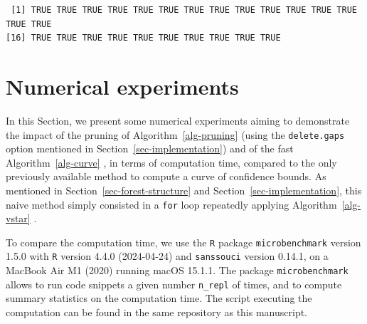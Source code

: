 \documentclass[
  11pt,
  a4paper,
]{article}
\newenvironment{Shaded}{}{}
\newcommand{\AttributeTok}[1]{\textcolor[rgb]{0.84,0.23,0.29}{#1}}
\newcommand{\CommentTok}[1]{\textcolor[rgb]{0.42,0.45,0.49}{#1}}
\newcommand{\ConstantTok}[1]{\textcolor[rgb]{0.00,0.36,0.77}{#1}}
\newcommand{\FunctionTok}[1]{\textcolor[rgb]{0.44,0.26,0.76}{#1}}
\newcommand{\NormalTok}[1]{\textcolor[rgb]{0.14,0.16,0.18}{#1}}
\newcommand{\OtherTok}[1]{\textcolor[rgb]{0.44,0.26,0.76}{#1}}
\newcommand{\SpecialCharTok}[1]{\textcolor[rgb]{0.00,0.36,0.77}{#1}}
\theoremstyle{definition}
\theoremstyle{plain}
\theoremstyle{plain}
\theoremstyle{plain}
\theoremstyle{definition}
\theoremstyle{remark}
\begin{document}
\begin{Shaded}
\end{Shaded}

\begin{verbatim}
 [1] TRUE TRUE TRUE TRUE TRUE TRUE TRUE TRUE TRUE TRUE TRUE TRUE TRUE TRUE TRUE
[16] TRUE TRUE TRUE TRUE TRUE TRUE TRUE TRUE TRUE TRUE
\end{verbatim}

\section{Numerical experiments}\label{sec-numeric}

In this Section, we present some numerical experiments aiming to
demonstrate the impact of the pruning of  Algorithm~\ref{alg-pruning} 
(using the \texttt{delete.gaps} option mentioned in
Section~\ref{sec-implementation}) and of the fast
 Algorithm~\ref{alg-curve} , in terms of computation time, compared to
the only previously available method to compute a curve of confidence
bounds. As mentioned in Section~\ref{sec-forest-structure} and
Section~\ref{sec-implementation}, this naive method simply consisted in
a \texttt{for} loop repeatedly applying  Algorithm~\ref{alg-vstar} .

To compare the computation time, we use the \texttt{R} package
\texttt{microbenchmark} version 1.5.0 \citep{microbenchmark} with
\texttt{R} version 4.4.0 (2024-04-24) and \texttt{sanssouci} version
0.14.1, on a MacBook Air M1 (2020) running macOS 15.1.1. The package
\texttt{microbenchmark} allows to run code snippets a given number
\texttt{n\_repl} of times, and to compute summary statistics on the
computation time. The script executing the computation can be found in
the same repository as this manuscript.
\end{document}
